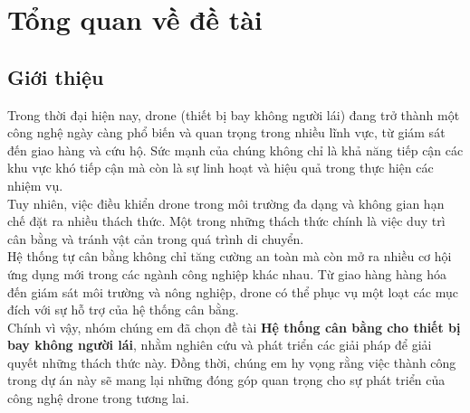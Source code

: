 \chapter{Tổng quan về đề tài}
\section{Giới thiệu}
\tab Trong thời đại hiện nay, drone (thiết bị bay không người lái) đang trở thành một công nghệ ngày càng phổ biến và quan trọng trong nhiều lĩnh vực, từ giám sát đến giao hàng và cứu hộ. Sức mạnh của chúng không chỉ là khả năng tiếp cận các khu vực khó tiếp cận mà còn là sự linh hoạt và hiệu quả trong thực hiện các nhiệm vụ.\\
\tab Tuy nhiên, việc điều khiển drone trong môi trường đa dạng và không gian hạn chế đặt ra nhiều thách thức. Một trong những thách thức chính là việc duy trì cân bằng và tránh vật cản trong quá trình di chuyển.\\
\tab Hệ thống tự cân bằng không chỉ tăng cường an toàn mà còn mở ra nhiều cơ hội ứng dụng mới trong các ngành công nghiệp khác nhau. Từ giao hàng hàng hóa đến giám sát môi trường và nông nghiệp, drone có thể phục vụ một loạt các mục đích với sự hỗ trợ của hệ thống cân bằng.\\
\tab Chính vì vậy, nhóm chúng em đã chọn đề tài \textbf{Hệ thống cân bằng cho thiết bị bay không người lái}, nhằm nghiên cứu và phát triển các giải pháp để giải quyết những thách thức này. Đồng thời, chúng em hy vọng rằng việc thành công trong dự án này sẽ mang lại những đóng góp quan trọng cho sự phát triển của công nghệ drone trong tương lai.
